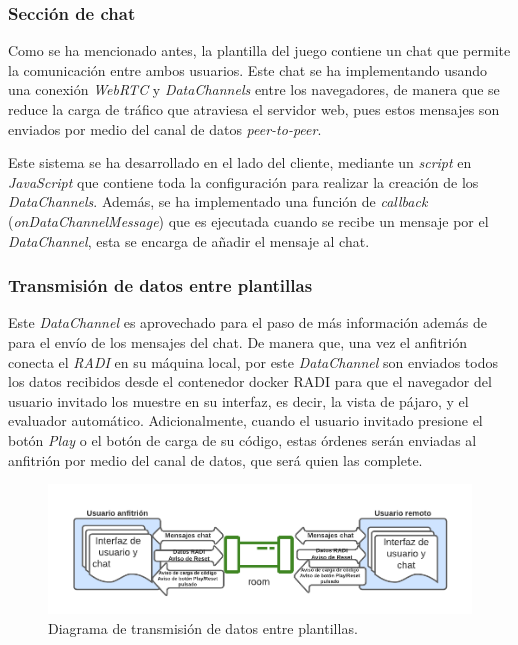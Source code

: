 \documentclass[a4paper, 12pt]{book}
\begin{document}
\subsubsection{Sección de chat}

Como se ha mencionado antes, la plantilla del juego contiene un chat que permite la comunicación entre ambos usuarios. Este chat se ha implementando usando una conexión \emph{WebRTC} y \emph{DataChannels} entre los navegadores, de manera que se reduce la carga de tráfico que atraviesa el servidor web, pues estos mensajes son enviados por medio del canal de datos \emph{peer-to-peer}.

Este sistema se ha desarrollado en el lado del cliente, mediante un \emph{script} en \emph{JavaScript} que contiene toda la configuración para realizar la creación de los \emph{DataChannels}. Además, se ha implementado una función de \emph{callback} (\emph{onDataChannelMessage}) que es ejecutada cuando se recibe un mensaje por el \emph{DataChannel}, esta se encarga de añadir el mensaje al chat.

\subsubsection{Transmisión de datos entre plantillas}

Este \emph{DataChannel} es aprovechado para el paso de más información además de para el envío de los mensajes del chat. De manera que, una vez el anfitrión conecta el \emph{RADI} en su máquina local, por este \emph{DataChannel} son enviados todos los datos recibidos desde el contenedor docker RADI para que el navegador del usuario invitado los muestre en su interfaz, es decir, la vista de pájaro, y el evaluador automático. Adicionalmente, cuando el usuario invitado presione el botón \emph{Play} o el botón de carga de su código, estas órdenes serán enviadas al anfitrión por medio del canal de datos, que será quien las complete.

\begin{figure}[H]
	\centering
    \includegraphics[width=15cm]{img/transmision_datos.png}
    \caption{Diagrama de transmisión de datos entre plantillas.}
    \label{figura:diagrama_conexion_webrtc}
\end{figure}
\end{document}
